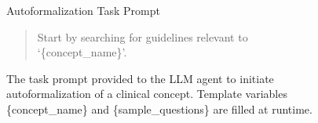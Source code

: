\begin{figure}[h]
\begin{AIbox}{Autoformalization Task Prompt}
\begin{quote}
Start by searching for guidelines relevant to `\{concept\_name\}'.

\end{quote}

\end{AIbox}
    \caption{The task prompt provided to the LLM agent to initiate autoformalization of a clinical concept. Template variables \{concept\_name\} and \{sample\_questions\} are filled at runtime.}
    \label{prompts:react_user_prompt}

\end{figure}
